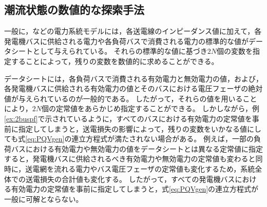 \documentclass[tombow,dvipdfmx]{corona-a5-1.1}
\begin{document}




\subsection{潮流状態の数値的な探索手法}


一般に，などの電力系統モデルには，各送電線のインピーダンス値に加えて，各発電機バスに供給される電力や各負荷バスで消費される電力の標準的な値がデータシートとして与えられている。
それらの標準的な値に基づき$2N$個の変数を指定することによって，残りの変数を数値的に求めることができる。


データシートには，各負荷バスで消費される有効電力と無効電力の値，および，各発電機バスに供給される有効電力の値とそのバスにおける電圧フェーザの絶対値が与えられているのが一般的である。
したがって，それらの値を用いることにより，$2N$個の定常値をあらかじめ指定することができる。
しかしながら，例\ref{ex:2buspf}で示されているように，すべてのバスにおける有効電力の定常値を事前に指定してしまうと，送電損失の影響によって，残りの変数をいかなる値にしても式\ref{eq:PQVgen}の連立方程式が満たされない場合がある。
例えば，一部の負荷バスにおける有効電力や無効電力の値をデータシートとは異なる定常値に指定すると，発電機バスに供給されるべき有効電力や無効電力の定常値も変わると同時に，送電網を流れる電力やバス電圧フェーザの定常値も変化するため，系統全体での送電損失の合計値も変化する。
したがって，すべての発電機バスにおける有効電力の定常値を事前に指定してしまうと，式\ref{eq:PQVgen}の連立方程式が一般に可解とならない。
\end{document}

